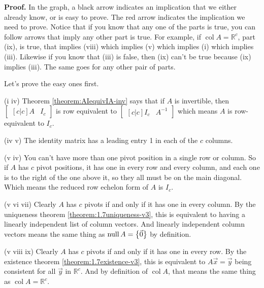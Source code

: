 \documentclass[11pt, letterpaper]{report}
\newenvironment{notes}{}{}
\newenvironment{book}{}{}
\let\originalleft\left
\let\originalright\right
\renewcommand{\left}{\mathopen{}\mathclose\bgroup\originalleft}
\renewcommand{\right}{\aftergroup\egroup\originalright}
\newcounter{example}[section]
\newcounter{theorem}[chapter]
\newcommand{\R}{\mathbb{R}}
\DeclareMathOperator{\col}{col}
\DeclareMathOperator{\nul}{null}
\begin{document}
\begin{notes}

\vfill
\newpage
\end{notes}
\begin{book}\textbf{Proof.} 
In the graph, a black arrow indicates an implication that we either already know, or is easy to prove. The red arrow indicates the implication we need to prove. Notice that if you know that any one of the parts is true, you can follow arrows that imply any other part is true.
For example, if $\col A = \R^c$, part (ix), is true, that implies (viii) which implies (v) which implies (i) which implies (iii). Likewise if you know that (iii) is false, then (ix) can't be true because (ix) implies (iii). The same goes for any other pair of parts.

Let's prove the easy ones first.

(i \rightarrow\hspace{1pt} iv) Theorem \ref{theorem:AIequivIA-inv} says that if $A$ is invertible, then $\begin{bmatrix}[c|c]
A & I_c
\end{bmatrix}$ is row equivalent to $\begin{bmatrix}[c|c]
I_c & A^{-1}
\end{bmatrix}$ which means $A$ is row-equivalent to $I_c$.

(iv \rightarrow\hspace{1pt} v) The identity matrix has a leading entry 1 in each of the $c$ columns.

(v \leftarrow\hspace{1pt} iv) You can't have more than one pivot position in a single row or column. So if $A$ has $c$ pivot positions, it has one in every row and every column, and each one is to the right of the one above it, so they all must be on the main diagonal. Which means the reduced row echelon form of $A$ is $I_c$.

(v \leftrightarrow\hspace{1pt}  vi \leftrightarrow\hspace{1pt} vii) Clearly $A$ has $c$ pivots if and only if it has one in every column. By the uniqueness theorem \ref{theorem:1.7uniqueness-v3}, this is equivalent to having a linearly independent list of column vectors. And linearly independent column vectors means the same thing as $\nul A = \left\{ \vec{0} \right\}$ by definition.

(v \leftrightarrow\hspace{1pt} viii \leftrightarrow\hspace{1pt} ix) Clearly $A$ has $c$ pivots if and only if it has one in every row. By the existence theorem \ref{theorem:1.7existence-v3}, this is equivalent to $A\vec{x}=\vec{y}$ being consistent for all $\vec{y}$ in $\R^c$. And by definition of $\col A$, that means the same thing as $\col A = \R^c$.


\end{book}
\end{document}
